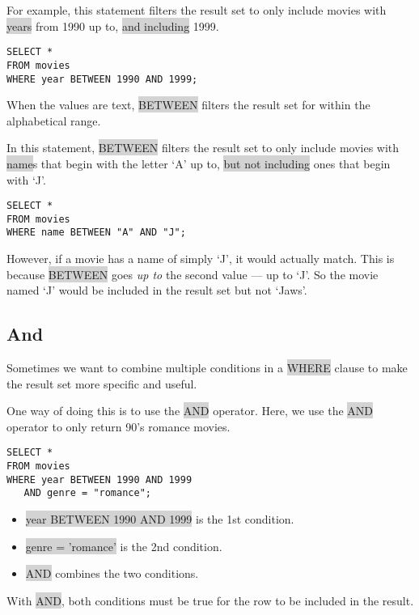 \documentclass[11pt]{article}
\begin{document}
{{For example, this statement filters the result set to only include movies with \colorbox{lightgray}{years} from 1990 up to, \colorbox{lightgray}{and including} 1999.
\begin{lstlisting}
SELECT *
FROM movies
WHERE year BETWEEN 1990 AND 1999;
\end{lstlisting}
When the values are text, \colorbox{lightgray}{BETWEEN} filters the result set for within the alphabetical range.

In this statement, \colorbox{lightgray}{BETWEEN} filters the result set to only include movies with \colorbox{lightgray}{name}s that begin with the letter ‘A’ up to, \colorbox{lightgray}{but not including} ones that begin with ‘J’.
\begin{lstlisting}
SELECT *
FROM movies
WHERE name BETWEEN "A" AND "J";
\end{lstlisting}
However, if a movie has a name of simply ‘J’, it would actually match. This is because \colorbox{lightgray}{BETWEEN} goes \textit{up to} the second value — up to ‘J’. So the movie named ‘J’ would be included in the result set but not ‘Jaws’.

\subsection{And}
Sometimes we want to combine multiple conditions in a \colorbox{lightgray}{WHERE} clause to make the result set more specific and useful.

One way of doing this is to use the \colorbox{lightgray}{AND} operator. Here, we use the \colorbox{lightgray}{AND} operator to only return 90’s romance movies.
\begin{lstlisting}
SELECT * 
FROM movies
WHERE year BETWEEN 1990 AND 1999
   AND genre = "romance";
\end{lstlisting}
\begin{itemize}[leftmargin = *]
\item \colorbox{lightgray}{year BETWEEN 1990 AND 1999} is the 1st condition.
\item \colorbox{lightgray}{genre = 'romance'} is the 2nd condition.
\item \colorbox{lightgray}{AND} combines the two conditions.
\end{itemize}

With \colorbox{lightgray}{AND}, both conditions must be true for the row to be included in the result.

}}
\end{document}
